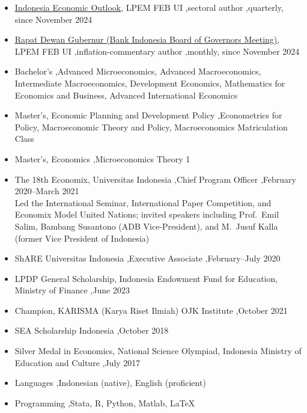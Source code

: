 \documentclass[letterpaper,10pt]{article}
\begin{document}

\begin{itemize}
\item \href{https://lpem.org/}{Indonesia Economic Outlook}, LPEM FEB UI \sep sectoral author \sep quarterly, since November 2024
\item \href{https://lpem.org/}{Rapat Dewan Gubernur (Bank Indonesia Board of Governors Meeting)}, LPEM FEB UI \sep inflation-commentary author \sep monthly, since November 2024
\end{itemize}


\begin{itemize}
\item Bachelor's \sep Advanced Microeconomics, Advanced Macroeconomics, Intermediate Macroeconomics, Development Economics, Mathematics for Economics and Business, Advanced International Economics
\item Master's, Economic Planning and Development Policy \sep Econometrics for Policy, Macroeconomic Theory and Policy, Macroeconomics Matriculation Class
\item Master's, Economics \sep Microeconomics Theory 1
\end{itemize}


\begin{itemize}
\item The 18th Economix, Universitas Indonesia \sep Chief Program Officer \sep February 2020--March 2021\\
Led the International Seminar, International Paper Competition, and Economix Model United Nations; invited speakers including Prof.\ Emil Salim, Bambang Susantono (ADB Vice-President), and M.\ Jusuf Kalla (former Vice President of Indonesia)
\item ShARE Universitas Indonesia \sep Executive Associate \sep February--July 2020
\end{itemize}


\begin{itemize}
\item LPDP General Scholarship, Indonesia Endowment Fund for Education, Ministry of Finance \sep June 2023
\item Champion, KARISMA (Karya Riset Ilmiah) OJK Institute \sep October 2021
\item SEA Scholarship Indonesia \sep October 2018
\item Silver Medal in Economics, National Science Olympiad, Indonesia Ministry of Education and Culture \sep July 2017
\end{itemize}


\begin{itemize}
\item Languages \sep Indonesian (native), English (proficient)
\item Programming \sep Stata, R, Python, Matlab, \LaTeX
\end{itemize}
\end{document}

